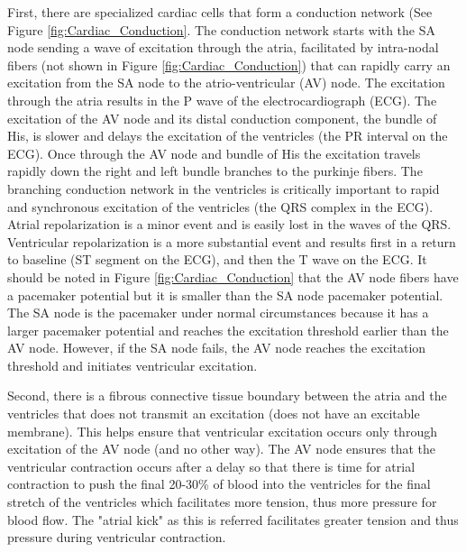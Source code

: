 First, there are specialized cardiac cells that form a conduction network (See Figure \ref{fig:Cardiac_Conduction}. The conduction network starts with the SA node sending a wave of excitation through the atria, facilitated by intra-nodal fibers (not shown in Figure \ref{fig:Cardiac_Conduction}) that can rapidly carry an excitation from the SA node to the atrio-ventricular (AV) node. The excitation through the atria results in the P wave of the electrocardiograph (ECG). The excitation of the AV node and its distal conduction component, the bundle of His, is slower and delays the excitation of the ventricles (the PR interval on the ECG). Once through the AV node and bundle of His the excitation travels rapidly down the right and left bundle branches to the purkinje fibers. The branching conduction network in the ventricles is critically important to rapid and synchronous excitation of the ventricles (the QRS complex in the ECG). Atrial repolarization is a minor event and is easily lost in the waves of the QRS. Ventricular repolarization is a more substantial event\footnotemark{} and results first in a return to baseline (ST segment on the ECG), and then the T wave on the ECG. It should be noted in Figure \ref{fig:Cardiac_Conduction} that the AV node fibers have a pacemaker potential but it is smaller than the SA node pacemaker potential. The SA node is the pacemaker under normal circumstances because it has a larger pacemaker potential and reaches the excitation threshold earlier than the AV node. However, if the SA node fails, the AV node reaches the excitation threshold and initiates ventricular excitation.

Second, there is a fibrous connective tissue boundary between the atria and the ventricles that does not transmit an excitation (does not have an excitable membrane). This helps ensure that ventricular excitation occurs only through excitation of the AV node (and no other way). The AV node ensures that the ventricular contraction occurs after a delay so that there is time for atrial contraction to push the final 20-30\% of blood into the ventricles for the final stretch of the ventricles which facilitates more tension, thus more pressure for blood flow. The "atrial kick" as this is referred facilitates greater tension and thus pressure during ventricular contraction.

